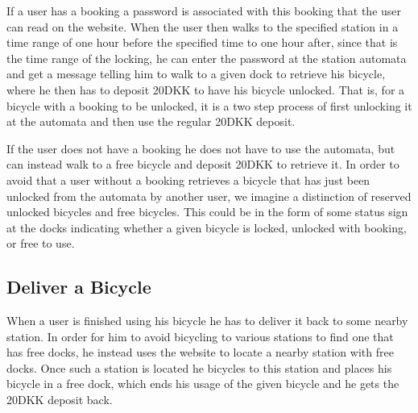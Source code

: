 If a user has a booking a password is associated with this booking that the user can read on the website.
When the user then walks to the specified station in a time range of one hour before the specified time to one hour after, since that is the time range of the locking, he can enter the password at the station automata and get a message telling him to walk to a given dock to retrieve his bicycle, where he then has to deposit 20DKK to have his bicycle unlocked.
That is, for a bicycle with a booking to be unlocked, it is a two step process of first unlocking it at the automata and then use the regular 20DKK deposit.

If the user does not have a booking he does not have to use the automata, but can instead walk to a free bicycle and deposit 20DKK to retrieve it.
In order to avoid that a user without a booking retrieves a bicycle that has just been unlocked from the automata by another user, we imagine a distinction of reserved unlocked bicycles and free bicycles.
This could be in the form of some status sign at the docks indicating whether a given bicycle is locked, unlocked with booking, or free to use.

\subsection{Deliver a Bicycle}
When a user is finished using his bicycle he has to deliver it back to some nearby station.
In order for him to avoid bicycling to various stations to find one that has free docks, he instead uses the website to locate a nearby station with free docks.
Once such a station is located he bicycles to this station and places his bicycle in a free dock, which ends his usage of the given bicycle and he gets the 20DKK deposit back.
